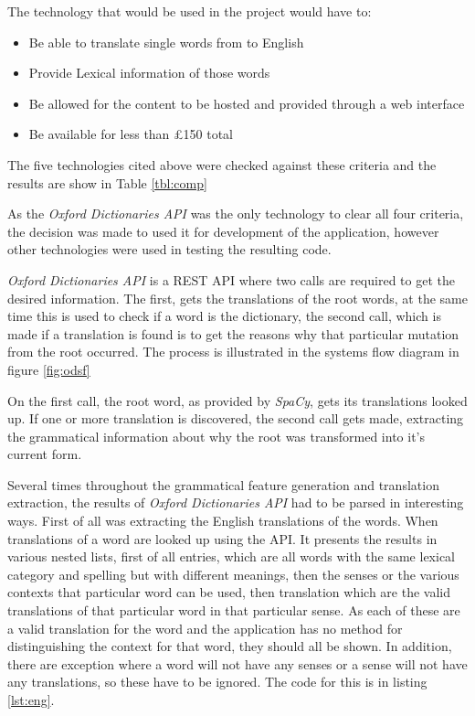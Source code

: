The technology that would be used in the project would have to:
\begin{itemize}
\item Be able to translate single words from to English
\item Provide Lexical information of those words
\item Be allowed for the content to be hosted and provided through a web interface
\item Be available for less than \pounds150 total
\end{itemize}

The five technologies cited above were checked against these criteria and the results are show in Table \ref{tbl:comp}



As the \textit{Oxford Dictionaries API} was the only technology to clear all four criteria, the decision was made to used it for development of the application, however other technologies were used in testing the resulting code.

\textit{Oxford Dictionaries API} is a REST API where two calls are required to get the desired information. The first, gets the translations of the root words, at the same time this is used to check if a word is the dictionary, the second call, which is made if a translation is found is to get the reasons why that particular mutation from the root occurred.  The process is illustrated in the systems flow diagram in figure \ref{fig:odsf}



On the first call, the root word, as provided by \textit{SpaCy}, gets its translations looked up. If one or more translation is discovered, the second call gets made, extracting the grammatical information about why the root was transformed into it's current form.

Several times throughout the grammatical feature generation and translation extraction, the results of \textit{Oxford Dictionaries API} had to be parsed in interesting ways. First of all was extracting the English translations of the words. When translations of a word are looked up using the API. It presents the results in various nested lists, first of all entries, which are all words with the same lexical category and spelling but with different meanings, then the senses or the various contexts that particular word can be used, then translation which are the valid translations of that particular word in that particular sense. As each of these are a valid translation for the word and the application has no method for distinguishing the context for that word, they should all be shown. In addition, there are exception where a word will not have any senses or a sense will not have any translations, so these have to be ignored. The code for this is in listing \ref{lst:eng}. 

